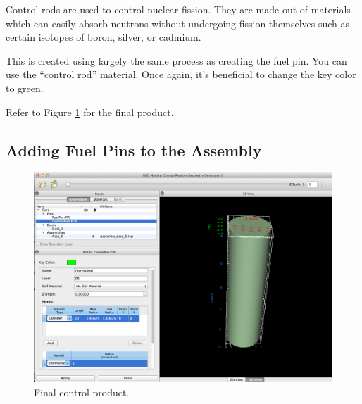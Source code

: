 Control rods are used to control nuclear fission. They are made out of materials which can easily absorb neutrons without undergoing fission themselves such as certain isotopes of boron, silver, or cadmium.

This is created using largely the same process as creating the fuel pin.  You can use the ``control rod'' material.  Once again, it's beneficial to change the key color to green.

Refer to Figure \ref{fig:Rect7} for the final product.

\subsection{Adding Fuel Pins to the Assembly}

\begin{figure}
  \vspace{-10pt}
  \begin{center}
    \includegraphics[width=0.8\linewidth]{Images/rect-control-rod.png}
  \end{center}
  \caption{Final control product.}
  \label{fig:Rect7}
  \vspace{-20pt}
\end{figure}


